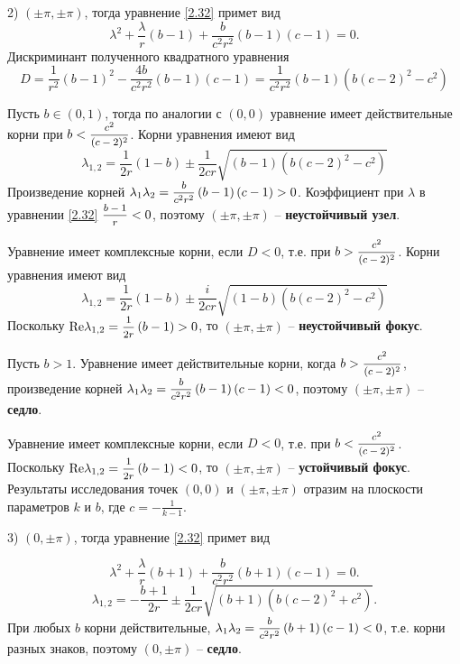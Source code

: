 \documentclass[a4paper,12pt, openany]{book}
\theoremstyle{plain} %
\theoremstyle{definition} %
\theoremstyle{remark} %
\numberwithin{equation}{chapter}
\begin{document}
{2) $(\pm \pi, \pm \pi)$, тогда уравнение \eqref{2.32} примет вид 
$$
\lambda ^2  + \frac{\lambda }{r}\left( {b - 1} \right) + \frac{b}{{c^2 r^2 }}\left( {b - 1} \right)\left( {c - 1} \right) = 0.$$
Дискриминант полученного квадратного уравнения 
\[
D = \frac{1}{{r^2 }}\left( {b-1} \right)^2  - \frac{{4b}}{{c^2 r^2 }}\left( {b - 1} \right)\left( {c - 1} \right) = \frac{1}{{c^2 r^2 }}\left( {b - 1} \right)\left( {b\left( {c - 2} \right)^2  - c^2 } \right)
\]

Пусть $b\in(0,1)$, тогда по аналогии с $(0,0)$ уравнение имеет действительные корни при $b< \mfrac{c^2}{(c-2)^2}$. Корни уравнения имеют вид
\[
\lambda _{1,2}  = \frac{1}{{2r}}\left( {1-b} \right) \pm \frac{1}{{2cr}}\sqrt {\left( {b - 1} \right)\left( {b\left( {c - 2} \right)^2  - c^2 } \right)} 
\]
Произведение корней $
\lambda _1 \lambda _2  = \mfrac{b}{{c^2 r^2 }}\left( {b - 1} \right)\left( {c - 1} \right) > 0
$. Коэффициент при $\lambda$ в уравнении \eqref{2.32}
$
\mfrac{{b - 1}}{r} < 0
$, поэтому $(\pm \pi, \pm \pi)$ -- \textbf{неустойчивый узел}. 

Уравнение имеет комплексные корни, если $D<0$, т.е. при $b> \mfrac{c^2}{(c-2)^2}$. Корни уравнения имеют вид
\[
\lambda _{1,2}  = \frac{1}{{2r}}\left( {1-b} \right) \pm \frac{i}{{2cr}}\sqrt {\left( {1 - b} \right)\left( {b\left( {c - 2} \right)^2  - c^2 } \right)} 
\]
Поскольку $
{\mathop{\rm Re}\nolimits} \lambda _{1,2}  = \mfrac{1}{{2r}}\left( {b - 1} \right) > 0
$, то $(\pm \pi, \pm \pi)$ -- \textbf{неустойчивый фокус}. 

Пусть $b>1$. Уравнение имеет действительные корни, когда $b> \mfrac{c^2}{(c-2)^2}$, произведение корней $
\lambda _1 \lambda _2  = \mfrac{b}{{c^2 r^2 }}\left( {b - 1} \right)\left( {c - 1} \right) < 0$, поэтому $(\pm \pi, \pm \pi)$ -- \textbf{седло}.

Уравнение имеет комплексные корни, если $D<0$, т.е. при $b< \mfrac{c^2}{(c-2)^2}$. Поскольку $
{\mathop{\rm Re}\nolimits} \lambda _{1,2}  = \mfrac{1}{{2r}}\left( {b - 1} \right) < 0
$, то $(\pm \pi, \pm \pi)$ -- \textbf{устойчивый фокус}.
\newpage
Результаты исследования точек $(0,0)$ и $(\pm\pi, \pm\pi)$ отразим  на плоскости параметров $k$ и $b$, где $c= - \frac{1}{k-1}$. 


3) $(0, \pm\pi)$, тогда уравнение \eqref{2.32} примет вид

\[
\lambda ^2  + \frac{\lambda }{r}\left( {b + 1} \right) + \frac{b}{{c^2 r^2 }}\left( {b + 1} \right)\left( {c - 1} \right) = 0.
\]
\[
\lambda _{1,2}  =  - \frac{{b + 1}}{{2r}} \pm \frac{1}{{2cr}}\sqrt {\left( {b + 1} \right)\left( {b\left( {c - 2} \right)^2  + c^2 } \right)} .
\]
При любых $b$ корни действительные, $
\lambda _1 \lambda _2  = \mfrac{b}{{c^2 r^2 }}\left( {b + 1} \right)\left( {c - 1} \right) < 0
$, т.е. корни разных знаков, поэтому $(0, \pm\pi)$ -- \textbf{седло}. 

}
\end{document}
